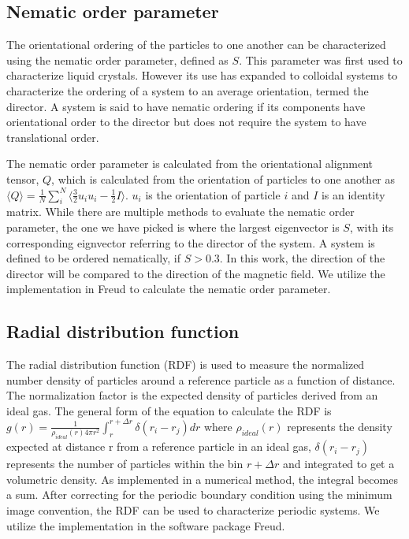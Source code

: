 \subsection{Nematic order parameter}
\label{section:nematic_order_parameter}

The orientational ordering of the particles to one another can be characterized using the nematic order parameter, 
defined as $S$. This parameter was first used to characterize liquid crystals. However its use has expanded to colloidal 
systems to characterize the ordering of a system to an average orientation, termed the director. A system is said to have 
nematic ordering if its components have orientational order to the director but does not require the system to have 
translational order.

The nematic order parameter is calculated from the orientational alignment tensor, $Q$, which is calculated from the 
orientation of particles to one another as 
$\langle Q \rangle = \frac{1}{N} \sum_{i}^{N} \langle \frac{3}{2}u_i u_i - \frac{1}{2}I \rangle$. $u_i$ is the 
orientation of particle $i$ and $I$ is an identity matrix. \cite{veerman_phase_1992} While there are multiple 
methods to evaluate the nematic order parameter, the one we have picked is where the largest eigenvector is $S$, 
with its corresponding eignvector referring to the director of the system. \cite{veerman_phase_1992} 
A system is defined to be ordered nematically, 
if $S > 0.3$. In this work, the direction of the director will be compared to the direction of the magnetic 
field. We utilize the implementation in Freud to calculate the nematic order parameter.

\subsection{Radial distribution function}
\label{section:radial_distribution}

The radial distribution function (RDF) is used to measure the normalized number density of particles around a 
reference particle as a function of distance. The normalization factor is the expected density of particles derived 
from an ideal gas. The general form of the equation to calculate the RDF is 
$g(r) = \frac{1}{\rho_{ideal}(r) 4\pi r^2} \int_{r}^{r+\Delta r} \delta(r_{i} - r_{j}) dr$ where $\rho_{ideal}(r)$ 
represents the density expected at distance r from a reference particle in an ideal gas, $\delta(r_{i} - r_{j})$ 
represents the number of particles within the bin $r + \Delta r$ and integrated to get a volumetric density. 
As implemented in a numerical method, the integral becomes a sum. After correcting for the periodic boundary 
condition using the minimum image convention, the RDF can be used to characterize periodic systems. We utilize 
the implementation in the software package Freud. \cite{ramasubramani_freud_2020}

